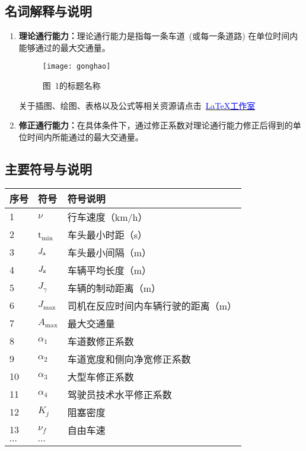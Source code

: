 \documentclass[12pt,a4paper]{nmmcm}
\newcommand\wordc[1]{\textbf{#1}}
\newcommand{\headcol}{\rowcolor{tableheadcolor}}
\begin{document}
\subsection{名词解释与说明}
\begin{enumerate}
\item \wordc{理论通行能力：}理论通行能力是指每一条车道~(或每一条道路) 在单位时间内
能够通过的最大交通量。

\begin{figure}[h!t]
\centerline{\texttt{[image: gonghao]}}
\caption{  图~1的标题名称}
\end{figure}

关于插图、绘图、表格以及公式等相关资源请点击~\href{http://www.latexstudio.net}{\textcolor{blue}{\LaTeX{}工作室}}

\item \wordc{修正通行能力：}在具体条件下，通过修正系数对理论通行能力修正后得到的单
位时间内所能通过的最大交通量。

\end{enumerate}
\subsection{主要符号与说明}

\begin{table}[h!]
  \centering
  \small
  \begin{tabular}{p{60pt}<{\centering}|p{60pt}<{\centering}p{180pt}<{\raggedright}}
   \hline
   \headcol 序号 & 符号 & 符号说明 \\
   \hline
    1 & $\nu$ & 行车速度（km/h） \\
    2 & t$_{\min}$ & 车头最小时距（s） \\
    3 & $J_{\rm a}$ & 车头最小间隔（m） \\
    4 & $J_{\rm z}$ & 车辆平均长度（m） \\
    5 & $J_{\gamma}$ & 车辆的制动距离（m） \\
    6 & $J_{\max}$ & 司机在反应时间内车辆行驶的距离（m） \\
    7 & $A_{\max}$ & 最大交通量 \\
    8 & $\alpha_{1}$ & 车道数修正系数 \\
    9 & $\alpha_{2}$ & 车道宽度和侧向净宽修正系数 \\
    10 & $\alpha_{3}$ & 大型车修正系数 \\
    11 & $\alpha_{4}$ & 驾驶员技术水平修正系数 \\
    12 & $K_{j}$ & 阻塞密度 \\
    13 & $\nu_{f}$ & 自由车速 \\
    $\cdots$ & $\cdots$\\
    \hline
  \end{tabular}
  \label{symbol}
\end{table}
\end{document}
